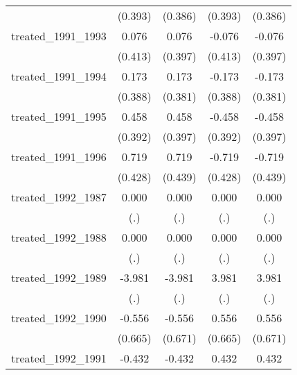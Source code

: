 {\begin{tabular}{l*{4}{c}}
            &     (0.393)         &     (0.386)         &     (0.393)         &     (0.386)         \\
[1em]
treated\_1991\_1993&       0.076         &       0.076         &      -0.076         &      -0.076         \\
            &     (0.413)         &     (0.397)         &     (0.413)         &     (0.397)         \\
[1em]
treated\_1991\_1994&       0.173         &       0.173         &      -0.173         &      -0.173         \\
            &     (0.388)         &     (0.381)         &     (0.388)         &     (0.381)         \\
[1em]
treated\_1991\_1995&       0.458         &       0.458         &      -0.458         &      -0.458         \\
            &     (0.392)         &     (0.397)         &     (0.392)         &     (0.397)         \\
[1em]
treated\_1991\_1996&       0.719         &       0.719         &      -0.719         &      -0.719         \\
            &     (0.428)         &     (0.439)         &     (0.428)         &     (0.439)         \\
[1em]
treated\_1992\_1987&       0.000         &       0.000         &       0.000         &       0.000         \\
            &         (.)         &         (.)         &         (.)         &         (.)         \\
[1em]
treated\_1992\_1988&       0.000         &       0.000         &       0.000         &       0.000         \\
            &         (.)         &         (.)         &         (.)         &         (.)         \\
[1em]
treated\_1992\_1989&      -3.981         &      -3.981         &       3.981         &       3.981         \\
            &         (.)         &         (.)         &         (.)         &         (.)         \\
[1em]
treated\_1992\_1990&      -0.556         &      -0.556         &       0.556         &       0.556         \\
            &     (0.665)         &     (0.671)         &     (0.665)         &     (0.671)         \\
[1em]
treated\_1992\_1991&      -0.432         &      -0.432         &       0.432         &       0.432         \\

\end{tabular}}
